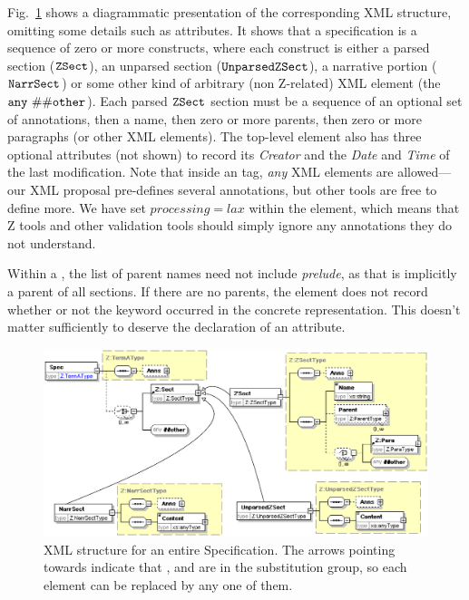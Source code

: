 \documentclass{llncs}  %
\begin{document}
Fig.~\ref{fig:spec}
shows a diagrammatic presentation of the corresponding XML
structure, omitting some details such as attributes.
It shows that a specification is a sequence of zero or more constructs,
where each construct is either a parsed section (${\tt ZSect}$), 
an unparsed section (${\tt UnparsedZSect}$), a narrative portion
(${\tt NarrSect}$) or some other kind of arbitrary (non Z-related) XML
element (the ${\tt any\ \#\#other}$).  Each parsed ${\tt ZSect}$
section must be  
a sequence of an optional set of annotations, then a name, then zero or
more parents, then zero or more paragraphs (or other XML elements).
The top-level  element also has three optional attributes 
(not shown) to record its \emph{Creator} and the \emph{Date} and
\emph{Time} of the last modification. 
Note that inside an  tag, \emph{any} XML elements are
allowed---our XML proposal pre-defines several annotations,
but other tools are free to define more.  We have set $processing=lax$
within the  element, which means that Z tools and other
validation tools should simply ignore any annotations they do not
understand. 

Within a , the list of parent names need not include
\textit{prelude}, as that is implicitly a parent of all sections.
If there are no parents,
the  element does not record whether or not
the keyword  occurred in the concrete representation.
This doesn't matter sufficiently to deserve the declaration of an attribute.

\begin{figure}[htbp]
  \centering
  \includegraphics[width=\textwidth]{specall.eps}
  \caption{XML structure for an entire Specification.  The arrows pointing
  towards  indicate that 
  ,  and  are in the
   substitution group, so each  element can be
  replaced by any one of them.} 
  \label{fig:spec}
\end{figure}
\end{document}
